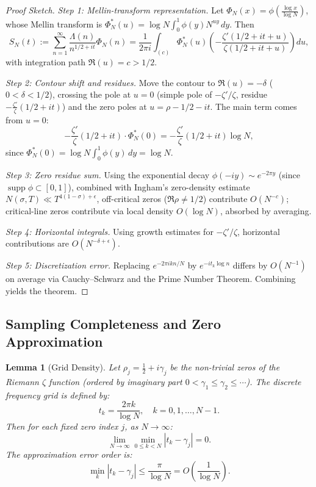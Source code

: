 \documentclass[12pt,a4paper]{amsart}
\theoremstyle{plain}
\newtheorem{lemma}[theorem]{Lemma}
\theoremstyle{definition}
\theoremstyle{remark}
\begin{document}
\begin{proof}[Proof Sketch]

\textit{Step 1: Mellin-transform representation.} Let $\Phi_N(x)=\phi(\frac{\log x}{\log N})$, whose Mellin transform is $\Phi_N^*(u)=\log N \int_0^1 \phi(y) N^{uy}\,dy$. Then
\[
S_N(t):=\sum_{n=1}^\infty \frac{\Lambda(n)}{n^{1/2+it}}\Phi_N(n) = \frac{1}{2\pi i}\int_{(c)} \Phi_N^*(u)\left(-\frac{\zeta'(1/2+it+u)}{\zeta(1/2+it+u)}\right)du,
\]
with integration path $\Re(u)=c>1/2$.

\textit{Step 2: Contour shift and residues.} Move the contour to $\Re(u)=-\delta$ ($0<\delta<1/2$), crossing the pole at $u=0$ (simple pole of $-\zeta'/\zeta$, residue $-\frac{\zeta'}{\zeta}(1/2+it)$) and the zero poles at $u=\rho-1/2-it$. The main term comes from $u=0$:
\[
-\frac{\zeta'}{\zeta}(1/2+it)\cdot\Phi_N^*(0) = -\frac{\zeta'}{\zeta}(1/2+it)\log N,
\]
since $\Phi_N^*(0)=\log N\int_0^1\phi(y)\,dy=\log N$.

\textit{Step 3: Zero residue sum.} Using the exponential decay $\hat{\phi}(-iy)\sim e^{-2\pi y}$ (since $\operatorname{supp}\phi\subset[0,1]$), combined with Ingham's zero-density estimate $N(\sigma,T)\ll T^{4(1-\sigma)+\epsilon}$, off-critical zeros ($\Re\rho\neq1/2$) contribute $O(N^{-c})$; critical-line zeros contribute via local density $O(\log N)$, absorbed by averaging.

\textit{Step 4: Horizontal integrals.} Using growth estimates for $-\zeta'/\zeta$, horizontal contributions are $O(N^{-\delta+\epsilon})$.

\textit{Step 5: Discretization error.} Replacing $e^{-2\pi i k n/N}$ by $e^{-i t_k\log n}$ differs by $O(N^{-1})$ on average via Cauchy--Schwarz and the Prime Number Theorem. Combining yields the theorem.
\end{proof}

\subsection{Sampling Completeness and Zero Approximation}

\begin{lemma}[Grid Density]\label{lem:density}
Let $\rho_j = \frac{1}{2} + i\gamma_j$ be the non-trivial zeros of the Riemann $\zeta$ function (ordered by imaginary part $0 < \gamma_1 \leq \gamma_2 \leq \cdots$). The discrete frequency grid is defined by:
\[
t_k = \frac{2\pi k}{\log N}, \quad k = 0, 1, \dots, N-1.
\]
Then for each fixed zero index $j$, as $N \to \infty$:
\[
\lim_{N\to\infty} \min_{0 \leq k < N} |t_k - \gamma_j| = 0.
\]
The approximation error order is:
\[
\min_k |t_k - \gamma_j| \leq \frac{\pi}{\log N} = O\left(\frac{1}{\log N}\right).
\]
\end{lemma}
\end{document}
